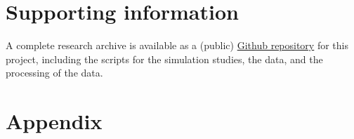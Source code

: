 \documentclass[AMA,STIX1COL,]{WileyNJD-v2}
\begin{document}
\hypertarget{supporting-information}{%
\section*{Supporting information}\label{supporting-information}}

A complete research archive is available as a (public) \href{https://github.com/daphneweemering/MasterThesis}{Github repository} for this project, including the scripts for the simulation studies, the data, and the processing of the data.





\newpage
\section{Appendix}
\end{document}
